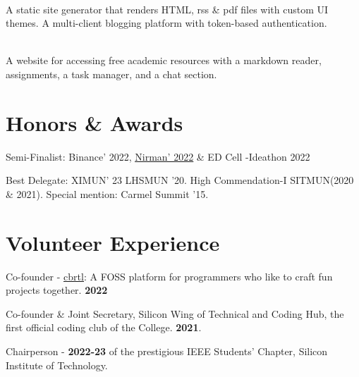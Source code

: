 \documentclass[]{assets/deedy-resume-openfont}
\begin{document}
\hfill {}\\
A static site generator that renders HTML, rss \& pdf files with custom UI themes. A multi-client blogging platform with token-based authentication. \\
\sectionsep


\hfill {}\\
A website for accessing free academic resources with a markdown reader, assignments, a task manager, and a chat section.\\

\sectionsep
%
%
\section{Honors \& Awards}
\begin{tightemize}  
\item Semi-Finalist: Binance' 2022, \href{https://nirmansilicon.tech/}{\underline{Nirman' 2022}} \& ED Cell -Ideathon 2022 \\
\item Best Delegate: XIMUN' 23 LHSMUN '20. High Commendation-I SITMUN(2020 \& 2021). Special mention: Carmel Summit '15. \\
\end{tightemize}
\section{Volunteer Experience}
\begin{tightemize} 
\item Co-founder - \underline{\href{https://cbrtl.github.io}{cbrtl}}: A FOSS platform for programmers who like to craft fun projects together. \textbf{2022}\\
\item Co-founder \& Joint Secretary, Silicon Wing of Technical and Coding Hub, the first official coding club of the College. \textbf{2021}.\\
\item Chairperson - \textbf{2022-23} of the prestigious IEEE Students’ Chapter, Silicon Institute of Technology.\\
\end{tightemize}
\ 
\end{document}
